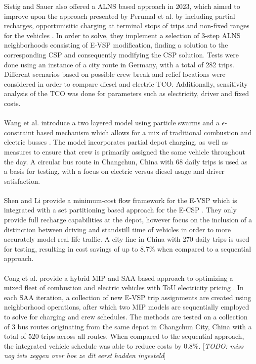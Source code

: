 \documentclass[ht]{article}
\newcommand{\todo}[1]{{\color{red}[\textit{TODO: #1}]}}
\begin{document}
Sistig and Sauer also offered a ALNS based approach in 2023, which aimed to
improve upon the approach presented by Perumal et al. by including partial
recharges, opportunisitic charging at terminal stops of trips and non-fixed
ranges for the vehicles \cite{Sistig2023}. In order to solve, they implement a
selection of 3-step ALNS neighborhoods consisting of E-VSP modification,
finding a solution to the corresponding CSP and consequently modifying the CSP
solution. Tests were done using an instance of a city route in Germany, with a
total of 282 trips. Different scenarios based on possible crew break and relief
locations were considered in order to compare diesel and electric TCO.
Additionally, sensitivity analysis of the TCO was done for parameters such as
electricity, driver and fixed costs. \\\\

Wang et al. introduce a two layered model using particle swarms and a
$\epsilon$-constraint based mechanism which allows for a mix of traditional
combustion and electric busses \cite{Wang2022}. The model incorporates partial
depot charging, as well as measures to ensure that crew is primarily assigned
the same vehicle throughout the day. A circular bus route in Changchun, China
with 68 daily trips is used as a basis for testing, with a focus on electric
versus diesel usage and driver satisfaction. \\\\

Shen and Li provide a minimum-cost flow framework for the E-VSP which is
integrated with a set partitioning based approach for the E-CSP
\cite{Shen2023}. They only provide full recharge capabilities at the depot,
however focus on the inclusion of a distinction between driving and standstill
time of vehicles in order to more accurately model real life traffic. A city
line in China with 270 daily trips is used for testing, resulting in cost
savings of up to 8.7\% when compared to a sequential approach. \\\\

Cong et al. provide a hybrid MIP and SAA based approach to optimizing a mixed
fleet of combustion and electric vehicles with ToU electricity pricing
\cite{Cong2024}. In each SAA iteration, a collection of new E-VSP trip
assignments are created using neighborhood operations, after which two MIP
models are sequentially employed to solve for charging and crew schedules. The
methods are tested on a collection of 3 bus routes originating from the same
depot in Changchun City, China with a total of 520 trips across all routes.
When compared to the sequential approach, the integrated vehicle schedule was
able to reduce costs by 0.8\%. \todo{miss nog iets zeggen over hoe ze dit eerst
  hadden ingesteld} \\\\
\end{document}
